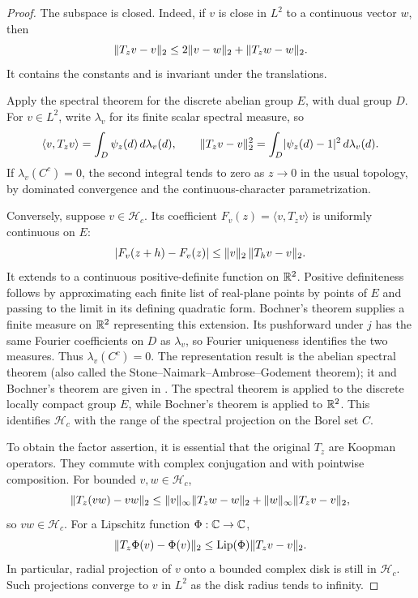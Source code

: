 \begin{proof}
The subspace is closed.  Indeed, if \(v\) is close in \(L^2\) to a
continuous vector \(w\), then
\[
 \lVert T_zv-v\rVert_2
 \le 2\lVert v-w\rVert_2+\lVert T_zw-w\rVert_2.
\]
It contains the constants and is invariant under the translations.

Apply the spectral theorem for the discrete abelian group \(E\), with
dual group \(D\).  For \(v\in L^2\), write \(\lambda_v\) for its finite
scalar spectral measure, so
\[
 \langle v,T_zv\rangle
   =\int_D\psi_z(d)\,d\lambda_v(d),\qquad
 \lVert T_zv-v\rVert_2^2
   =\int_D\lvert\psi_z(d)-1\rvert^2\,d\lambda_v(d).
\]
If \(\lambda_v(C^c)=0\), the second integral tends to
zero as \(z\to0\) in the usual topology, by dominated convergence and
the continuous-character parametrization.

Conversely, suppose \(v\in\mathcal H_c\).  Its coefficient
\(F_v(z)=\langle v,T_zv\rangle\) is uniformly continuous on \(E\):
\[
 \lvert F_v(z+h)-F_v(z)\rvert
 \le \lVert v\rVert_2\,\lVert T_hv-v\rVert_2 .
\]
It extends to a continuous positive-definite function on \(\mathbb R^2\).
Positive definiteness follows by approximating each finite list of
real-plane points by points of \(E\) and passing to the limit in its
defining quadratic form.  Bochner's theorem supplies a finite measure
on \(\mathbb R^2\) representing this extension.  Its pushforward under \(j\)
has the same Fourier coefficients on \(D\) as \(\lambda_v\), so Fourier
uniqueness identifies the two measures.  Thus \(\lambda_v(C^c)=0\).
The representation result is the abelian spectral theorem
(also called the Stone--Naimark--Ambrose--Godement theorem); it and
Bochner's theorem are given in
\citet[Theorems~D.3.1 and~D.2.2]{Bekka2008}. The spectral theorem
is applied to the discrete locally compact group $E$, while
Bochner's theorem is applied to $\mathbb R^2$.  This identifies
\(\mathcal H_c\) with the range of the spectral projection on the Borel
set \(C\).

To obtain the factor assertion, it is essential that the original
\(T_z\) are Koopman operators.  They commute with complex conjugation
and with pointwise composition.  For bounded \(v,w\in\mathcal H_c\),
\[
 \lVert T_z(vw)-vw\rVert_2
 \le \lVert v\rVert_\infty\lVert T_zw-w\rVert_2
     +\lVert w\rVert_\infty\lVert T_zv-v\rVert_2,
\]
so \(vw\in\mathcal H_c\).  For a Lipschitz function
\(\Phi:\mathbb C\to\mathbb C\),
\[
 \lVert T_z\Phi(v)-\Phi(v)\rVert_2
 \le {\rm Lip}(\Phi)\lVert T_zv-v\rVert_2 .
\]
In particular, radial projection of \(v\) onto a bounded complex disk
is still in \(\mathcal H_c\).  Such projections converge to \(v\)
in \(L^2\) as the disk radius tends to infinity.


\end{proof}
